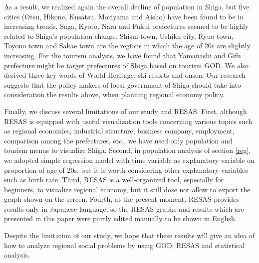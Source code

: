 \documentclass[10pt, conference, compsocconf]{IEEEtran}
\begin{document}
As a result, we realized again the overall decline of population in Shiga, but five cities (Otsu, Hikone, Kusatsu, Moriyama and Aisho) have been found to be in increasing trends. Saga, Kyoto, Nara and Fukui prefectures seemed to be highly related to Shiga's population change. Shisui town, Ushiku city, Ryuo town, Toyono town and Sakae town are the regions in which the age of 20s are slightly increasing. 
For the tourism analysis, we have found that Yamanashi and Gifu prefecture might be target prefectures of Shiga based on tourism GOD. We also derived three key words of World Heritage, ski resorts and onsen.  
Our research suggests that the policy makers of local government of Shiga should take into consideration the results above, when planning regional economy policy.


Finally, we discuss several limitations of our study and RESAS.
First, although RESAS is equipped with useful visualization tools concerning various topics such as regional economics, industrial structure, business company, employment, comparison among the prefectures, etc., we have used only population and tourism menus to visualize Shiga. Second, in population analysis of section \ref{reg}, we adopted simple regression model with time variable as explanatory variable on proportion of age of 20s, but it is worth considering other explanatory variables such as birth rate.
Third, RESAS is a well-organized tool, especially for beginners, to  visualize regional economy, but it still dose not allow to export the graph shown on the screen. Fourth, at the present moment, RESAS provides results only in Japanese language, so the RESAS graphs and results which are presented in this paper were partly edited manually to be shown in English.

Despite the limitation of our study, we hope that these results will give an idea of how to analyze regional social problems by using GOD, RESAS and statistical analysis.


\end{document}
